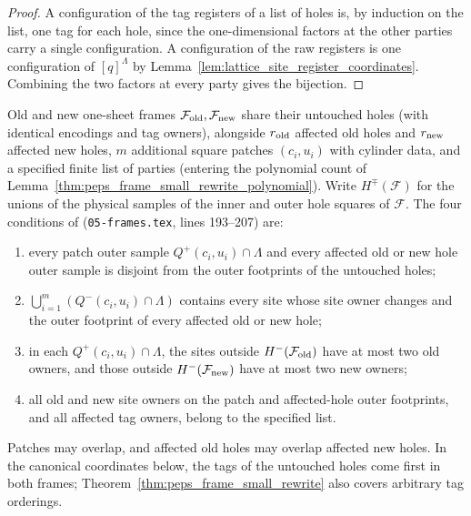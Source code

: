 \begin{proof}\leanok
    A configuration of the tag registers of a list of holes is, by induction
    on the list, one tag for each hole, since the one-dimensional factors at
    the other parties carry a single configuration. A configuration of the
    raw registers is one configuration of $[q]^\Lambda$ by
    Lemma~\ref{lem:lattice_site_register_coordinates}. Combining the two
    factors at every party gives the bijection.
\end{proof}

\begin{definition}
    \label{def:peps_frame_rewrite_data}
    \leanok
    Old and new one-sheet frames $\mathcal F_{\rm old},\mathcal F_{\rm new}$ share their untouched holes (with identical encodings and tag owners), alongside $r_{\rm old}$ affected old holes and $r_{\rm new}$ affected new holes, $m$ additional square patches
    $(c_i,u_i)$ with cylinder data, and a specified finite list of parties (entering the polynomial count of
    Lemma~\ref{thm:peps_frame_small_rewrite_polynomial}).
    Write $H^\mp(\mathcal F)$ for the unions of the physical samples of the
    inner and outer hole squares of $\mathcal F$. The four conditions of
    \cite[Lemma~6.3]{OpenAI2026PolynomialPEPS}
    (\texttt{05-frames.tex}, lines 193--207) are:
    \begin{enumerate}
        \item every patch outer sample $Q^+(c_i,u_i)\cap\Lambda$ and every affected old or new hole outer sample is disjoint from the outer footprints of the untouched holes;
        \item $\bigcup_{i=1}^m (Q^-(c_i,u_i)\cap\Lambda)$ contains every site whose
              site owner changes and the outer footprint of every
              affected old or new hole;
        \item in each $Q^+(c_i,u_i)\cap\Lambda$, the sites outside
              $H^-(\mathcal F_{\rm old})$ have at most two old owners, and those outside $H^-(\mathcal F_{\rm new})$ have at most two new
              owners;
        \item all old and new site owners on the patch and affected-hole outer footprints, and all affected tag owners, belong to
              the specified list.
    \end{enumerate}
    Patches may overlap, and affected old holes may overlap affected new
    holes. In the canonical coordinates below, the tags of the untouched
    holes come first in both frames; Theorem~\ref{thm:peps_frame_small_rewrite}
    also covers arbitrary tag orderings.
\end{definition}

